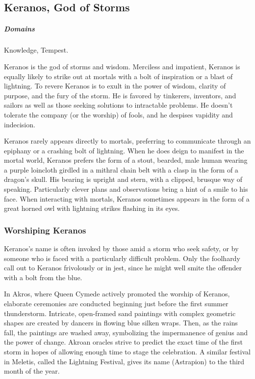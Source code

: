 \subsection*{Keranos, God of Storms} \label{ssec::keranos}
    \subparagraph{Domains} Knowledge, Tempest.

    Keranos is the god of storms and wisdom. Merciless and impatient, Keranos is equally likely to strike out at mortals with a bolt of inspiration or a blast of lightning. To revere Keranos is to exult in the power of wisdom, clarity of purpose, and the fury of the storm. He is favored by tinkerers, inventors, and sailors as well as those seeking solutions to intractable problems. He doesn't tolerate the company (or the worship) of fools, and he despises vapidity and indecision.

    Keranos rarely appears directly to mortals, preferring to communicate through an epiphany or a crashing bolt of lightning. When he does deign to manifest in the mortal world, Keranos prefers the form of a stout, bearded, male human wearing a purple loincloth girdled in a mithral chain belt with a clasp in the form of a dragon's skull. His bearing is upright and stern, with a clipped, brusque way of speaking. Particularly clever plans and observations bring a hint of a smile to his face. When interacting with mortals, Keranos sometimes appears in the form of a great horned owl with lightning strikes flashing in its eyes.

    \subsubsection{Worshiping Keranos}
        Keranos's name is often invoked by those amid a storm who seek safety, or by someone who is faced with a particularly difficult problem. Only the foolhardy call out to Keranos frivolously or in jest, since he might well smite the offender with a bolt from the blue.

        In Akros, where Queen Cymede actively promoted the worship of Keranos, elaborate ceremonies are conducted beginning just before the first summer thunderstorm. Intricate, open-framed sand paintings with complex geometric shapes are created by dancers in flowing blue silken wraps. Then, as the rains fall, the paintings are washed away, symbolizing the impermanence of genius and the power of change. Akroan oracles strive to predict the exact time of the first storm in hopes of allowing enough time to stage the celebration. A similar festival in Meletis, called the Lightning Festival, gives its name (Astrapion) to the third month of the year.

